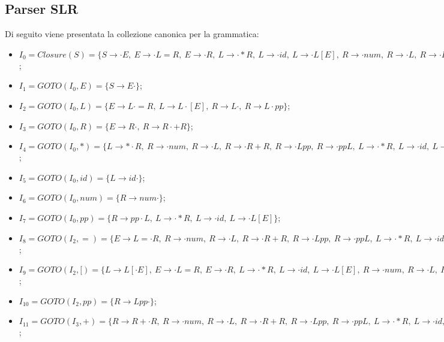\documentclass[a4paper,italian]{article}
\begin{document}
\subsection*{Parser SLR}
Di seguito viene presentata la collezione canonica per la grammatica:
\begin{itemize}
	\item $I_{0}=Closure(S)=\{S \rightarrow \cdot E,\  E \rightarrow \cdot L = R,\  E \rightarrow \cdot R,\  L \rightarrow \cdot * R,\  L \rightarrow \cdot id,\  L \rightarrow \cdot L [ E ],\  R \rightarrow \cdot num,\  R \rightarrow \cdot L,\  R \rightarrow \cdot R + R,\  R \rightarrow \cdot L pp,\  R \rightarrow \cdot pp L\}$;
	\item $I_{1}=GOTO(I_{0},E)=\{S\rightarrow E \cdot\}$;
	\item $I_{2}=GOTO(I_{0},L)=\{E \rightarrow L\cdot = R,\  L \rightarrow L\cdot [ E ],\  R \rightarrow L\cdot ,\  R \rightarrow L\cdot pp\}$;
	\item $I_{3}=GOTO(I_{0},R)=\{E \rightarrow R\cdot ,\  R \rightarrow R\cdot + R\}$;
	\item $I_{4}=GOTO(I_{0},*)=\{L \rightarrow  *\cdot R,\  R \rightarrow  \cdot num,\  R \rightarrow  \cdot L,\  R \rightarrow  \cdot R + R,\  R \rightarrow  \cdot L pp,\  R \rightarrow  \cdot pp L,\  L \rightarrow  \cdot * R,\  L \rightarrow  \cdot id,\  L \rightarrow  \cdot L [ E ]\}$;
	\item $I_{5}=GOTO(I_{0},id)=\{L\rightarrow id\cdot\}$;
	\item $I_{6}=GOTO(I_{0},num)=\{R\rightarrow num\cdot\}$;
	\item $I_{7}=GOTO(I_{0},pp)=\{R \rightarrow  pp\cdot L,\  L \rightarrow  \cdot * R,\  L \rightarrow  \cdot id,\  L \rightarrow  \cdot L [ E ]\}$;
	\item $I_{8}=GOTO(I_{2},=)=\{E \rightarrow L =\cdot R,\ R \rightarrow \cdot num,\ R \rightarrow \cdot L,\ R \rightarrow \cdot R + R,\ R \rightarrow \cdot L pp,\ R \rightarrow \cdot pp L,\ L \rightarrow \cdot * R,\ L \rightarrow \cdot id,\ L \rightarrow \cdot L [ E ]\}$;
	\item $I_{9}=GOTO(I_{2},[)=\{L \rightarrow L [\cdot E ],\ E \rightarrow \cdot L = R,\ E \rightarrow \cdot R,\ L \rightarrow \cdot * R,\ L \rightarrow \cdot id,\ L \rightarrow \cdot L [ E ],\ R \rightarrow \cdot num,\ R \rightarrow \cdot L,\ R \rightarrow \cdot R + R,\ R \rightarrow \cdot L pp,\ R \rightarrow \cdot pp L\}$;
	\item $I_{10}=GOTO(I_{2},pp)=\{R \rightarrow L pp\cdot \}$;
	\item $I_{11}=GOTO(I_{3},+)=\{R \rightarrow R +\cdot R,\ R \rightarrow \cdot num,\ R \rightarrow \cdot L,\ R \rightarrow \cdot R + R,\ R \rightarrow \cdot L pp,\ R \rightarrow \cdot pp L,\ L \rightarrow \cdot * R,\ L \rightarrow \cdot id,\ L \rightarrow \cdot L [ E ]\}$;

\end{itemize}
\end{document}
